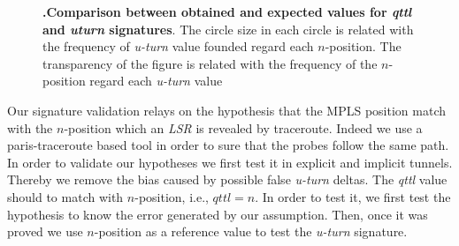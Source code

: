 \begin{figure*}[!t]
\centering
{}
\hfil
{}
\hfil
{}
\hfil
{}
\caption{\textbf{.Comparison between obtained and expected values for \textit{qttl} and \textit{uturn} signatures}. The circle size in each circle is related with the frequency of \textit{u-turn} value founded regard each $n$-position. The transparency of the figure is related with the frequency of the  $n$-position regard each \textit{u-turn} value}
\label{fig_signatures}
\end{figure*}



Our signature validation relays on the hypothesis that the MPLS position match with the $n$-position  which an \textit{LSR} is revealed by traceroute. Indeed we use a paris-traceroute based tool in order to sure that the probes follow the same path. In order to validate our hypotheses we first test it in explicit and implicit tunnels. Thereby we remove the bias caused by possible false \textit{u-turn} deltas. The \textit{qttl} value should to match with $n$-position, i.e., $qttl=n$. In order to test it, we first test the hypothesis to know the error generated by our assumption. Then, once it  was proved  we use $n$-position as a reference value to test the \textit{u-turn} signature. 

